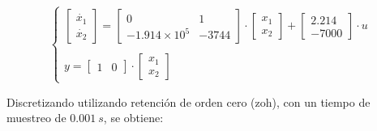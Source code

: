 \vspace{-0.5cm}
\begin{equation}
    \begin{cases}
        \begin{bmatrix}
            \dot{x_1}   \\
            \dot{x_2}   
        \end{bmatrix}
        =

        \begin{bmatrix}
            0   &   1 \\
            -1.914 \times 10^5   &  -3744           
        \end{bmatrix}

        \cdot
        \begin{bmatrix}
            x_1 \\
            x_2 
        \end{bmatrix}
        +
        \begin{bmatrix}
            2.214 \\
            -7000           
        \end{bmatrix}
        \cdot
        u 
        \\
        \\
        y =
        \begin{bmatrix}
            1 & 0
        \end{bmatrix}
        \cdot
        \begin{bmatrix}
            x_1 \\
            x_2
        \end{bmatrix}

    \end{cases}
    \label{eq:modelo_continuo}
\end{equation}
\vspace{-0.5cm}

Discretizando utilizando retención de orden cero (zoh), con un tiempo de muestreo de $0.001\ s$, se obtiene:

